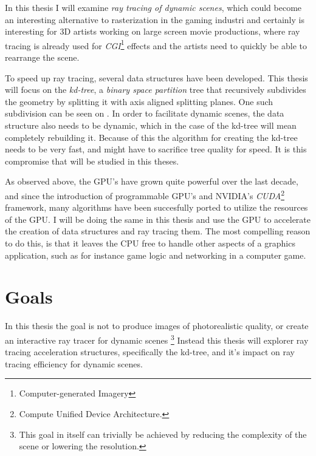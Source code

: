 
In this thesis I will examine \textit{ray tracing of dynamic scenes},
which could become an interesting alternative to rasterization in the
gaming industri and certainly is interesting for 3D artists working on
large screen movie productions, where ray tracing is already used for
\textit{CGI}\footnote{Computer-generated Imagery} effects and the
artists need to quickly be able to rearrange the scene.



To speed up ray tracing, several data structures have been
developed. This thesis will focus on the \textit{kd-tree}, a
\textit{binary space partition} tree that recursively subdivides the
geometry by splitting it with axis aligned splitting planes. One such
subdivision can be seen on . In order to
facilitate dynamic scenes, the data structure also needs to be
dynamic, which in the case of the kd-tree will mean completely
rebuilding it. Because of this the algorithm for creating the kd-tree
needs to be very fast, and might have to sacrifice tree quality for
speed. It is this compromise that will be studied in this theses.



As observed above, the GPU's have grown quite powerful over the last
decade, and since the introduction of programmable GPU's and
NVIDIA's \textit{CUDA}\footnote{Compute Unified Device Architecture.}
framework, many algorithms have been succesfully ported to utilize the
resources of the GPU. I will be doing the same in this thesis and use
the GPU to accelerate the creation of data structures and ray tracing
them. The most compelling reason to do this, is that it leaves the CPU
free to handle other aspects of a graphics application, such as for
instance game logic and networking in a computer game.



\section{Goals}

In this thesis the goal is not to produce images of photorealistic
quality, or create an interactive ray tracer for dynamic
scenes \footnote{This goal in itself can trivially be achieved by
  reducing the complexity of the scene or lowering the resolution.}
Instead this thesis will explorer ray tracing acceleration structures,
specifically the kd-tree, and it's impact on ray tracing efficiency
for dynamic scenes.

